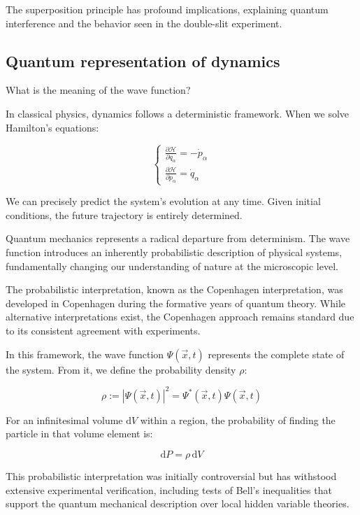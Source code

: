 The superposition principle has profound implications, explaining quantum interference and the behavior seen in the double-slit experiment.

\subsection{Quantum representation of dynamics}
What is the meaning of the wave function?

In classical physics, dynamics follows a deterministic framework. When we solve Hamilton's equations:

\[
\left\{\begin{array}{l}
\frac{\partial \mathcal{H}}{\partial q_{\alpha}}=-\dot{p}_{\alpha}  \\
\frac{\partial \mathcal{H}}{\partial p_{\alpha}}=\dot{q}_{\alpha}
\end{array}\right.
\]

We can precisely predict the system's evolution at any time. Given initial conditions, the future trajectory is entirely determined.

Quantum mechanics represents a radical departure from determinism. The wave function introduces an inherently probabilistic description of physical systems, fundamentally changing our understanding of nature at the microscopic level.

The probabilistic interpretation, known as the Copenhagen interpretation, was developed in Copenhagen during the formative years of quantum theory. While alternative interpretations exist, the Copenhagen approach remains standard due to its consistent agreement with experiments.

In this framework, the wave function $\Psi(\vec{x}, t)$ represents the complete state of the system. From it, we define the probability density $\rho$:

\begin{equation}
\rho:=|\Psi(\vec{x}, t)|^{2} = \Psi^*(\vec{x}, t)\Psi(\vec{x}, t)
\end{equation}

For an infinitesimal volume $\mathrm{d}V$ within a region, the probability of finding the particle in that volume element is:

\begin{equation}
\mathrm{d}P=\rho\,\mathrm{d}V
\end{equation}

This probabilistic interpretation was initially controversial but has withstood extensive experimental verification, including tests of Bell's inequalities that support the quantum mechanical description over local hidden variable theories.

